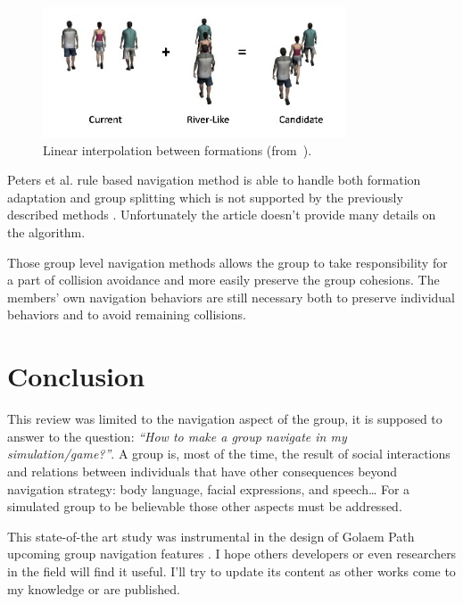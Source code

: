 \documentclass[a4paper,titlepage]{article}
\begin{document}
\begin{figure}[h]
\centering
\includegraphics[width=0.8\textwidth]{FormationsLinearInterpolation.jpg}
\caption{Linear interpolation between formations (from~\cite{Karamouzas:2010fi}).}
\label{fig:formations_linear_interpolation}
\end{figure} 

Peters et al. rule based navigation method is able to handle both formation adaptation and group splitting which is not supported by the previously described methods \cite{Peters:2009kx}. Unfortunately the article doesn’t provide many details on the algorithm.

Those group level navigation methods allows the group to take responsibility for a part of collision avoidance and more easily preserve the group cohesions. The members’ own navigation behaviors are still necessary both to preserve individual behaviors and to avoid remaining collisions. 

\section{Conclusion}
\label{sec:conclusion}

This review was limited to the navigation aspect of the group, it is supposed to answer to the question: \emph{“How to make a group navigate in my simulation/game?”}. A group is, most of the time, the result of social interactions and relations between individuals that have other consequences beyond navigation strategy: body language, facial expressions, and speech… For a simulated group to be believable those other aspects must be addressed.

This state-of-the art study was instrumental in the design of Golaem Path upcoming group navigation features \cite{GolaemPath:tw}. I hope others developers or even researchers in the field will find it useful. I’ll try to update its content as other works come to my knowledge or are published.

\pagebreak


\end{document}
